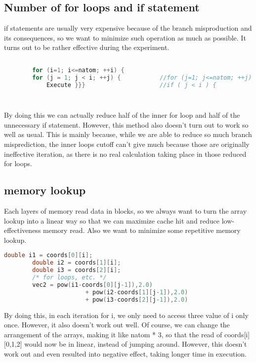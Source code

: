 \documentclass{cs4444}
\begin{document}
\subsection{Number of for loops and if statement}
	if statements are usually very expensive because of the branch misproduction and its consequences, so we want to minimize such operation as much as possible. It turns out to be rather effective during the experiment. 
		\begin{lstlisting}[language=C] 
		
	 	for (i=1; i<=natom; ++i) {
        for (j = 1; j < i; ++j) {			//for (j=1; j<=natom; ++j) {
            Execute	}}}						//if ( j < i ) {   
            
            
	 \end{lstlisting}
	 
	 By doing this we can actually reduce half of the inner for loop and half of the unnecessary if statement. However, this method also doesn't turn out to work so well as usual. This is mainly because, while we are able to reduce so much branch misprediction, the inner loops cutoff can't give much because those are originally ineffective iteration, as there is no real calculation taking place in those reduced for loops. 
		
\subsection{memory lookup} 
	Each layers of memory read data in blocks, so we always want to turn the array lookup into a linear way so that we can maximize cache hit and reduce low-effectiveness memory read. Also we want to minimize some repetitive memory lookup.
	 \begin{lstlisting}[language=C] 
		double i1 = coords[0][i];
      	double i2 = coords[1][i];
      	double i3 = coords[2][i];
	 	/* for loops, etc. */
	 	vec2 = pow(i1-coords[0][j-1]),2.0)
                       + pow(i2-coords[1][j-1]),2.0)
                       + pow(i3-coords[2][j-1]),2.0)
	 \end{lstlisting}
	 
	 By doing this, in each iteration for i, we only need to access three value of i only once. However, it also doesn't work out well. Of course, we can change the arrangement of the arrays, making it like natom * 3, so that the read of coords[i][0,1,2] would now be in linear, instead of jumping around. However, this doesn't work out and even resulted into negative effect, taking longer time in execution. 
	 
\end{document}
